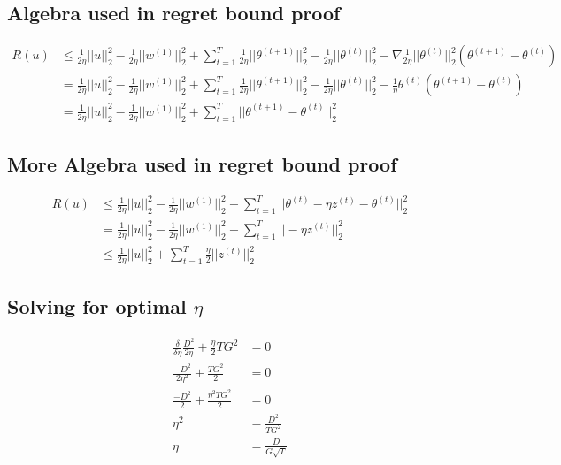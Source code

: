\documentclass[11pt]{article}
\begin{document}
\subsection{Algebra used in regret bound proof}
\label{sec:Algebra1}
\begin{equation}
    \begin{split}
        R(u) &\leq \frac{1}{2\eta} ||u||^2_2 - \frac{1}{2\eta} ||w^{(1)}||^2_2 + \sum_{t=1}^T \frac{1}{2\eta} ||\theta^{(t+1)}||^2_2 - \frac{1}{2\eta} ||\theta^{(t)}||^2_2 - \nabla \frac{1}{2\eta} ||\theta^{(t)}||^2_2(\theta^{(t + 1)} - \theta^{(t)}) \\
        &= \frac{1}{2\eta} ||u||^2_2 - \frac{1}{2\eta} ||w^{(1)}||^2_2 + \sum_{t=1}^T \frac{1}{2\eta} ||\theta^{(t+1)}||^2_2 - \frac{1}{2\eta} ||\theta^{(t)}||^2_2 - \frac{1}{\eta} \theta^{(t)} (\theta^{(t + 1)} - \theta^{(t)}) \\
        &= \frac{1}{2\eta} ||u||^2_2 - \frac{1}{2\eta} ||w^{(1)}||^2_2 + \sum_{t=1}^T ||\theta^{(t+1)} - \theta^{(t)}||^2_2
    \end{split}
\end{equation}

\subsection{More Algebra used in regret bound proof}
\label{sec:Algebra2}
\begin{equation}
    \begin{split}
        R(u) &\leq \frac{1}{2\eta} ||u||^2_2 - \frac{1}{2\eta} ||w^{(1)}||^2_2 + \sum_{t=1}^T ||\theta^{(t)} - \eta z^{(t)} - \theta^{(t)}||^2_2\\
        &= \frac{1}{2\eta} ||u||^2_2 - \frac{1}{2\eta} ||w^{(1)}||^2_2 + \sum_{t=1}^T ||- \eta z^{(t)}||^2_2\\
        &\leq \frac{1}{2\eta} ||u||^2_2 + \sum_{t=1}^T \frac{\eta}{2}||z^{(t)}||^2_2
    \end{split}
\end{equation}

\subsection{Solving for optimal \(\eta\)}
\label{sec:Algebra3}
\begin{align*}
    \frac{\delta}{\delta \eta} \frac{D^2}{2\eta} + \frac{\eta}{2}TG^2 &= 0\\
    \frac{-D^2}{2\eta^2} + \frac{TG^2}{2} &= 0\\
    \frac{-D^2}{2} + \frac{\eta^2TG^2}{2} &= 0\\
    \eta^2 &= \frac{D^2}{TG^2} \\
    \eta &= \frac{D}{G\sqrt{T}}
\end{align*}
\end{document}
